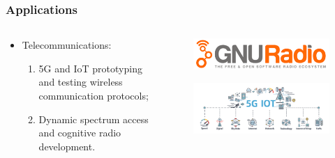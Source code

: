 \begin{frame}
	\frametitle{Applications}
    
\begin{columns}
        \begin{column}{0.5\textwidth}
     \begin{itemize}
    \item Telecommunications:
    \begin{enumerate}
     \item 5G and IoT prototyping and testing wireless communication protocols;
     \item Dynamic spectrum access and cognitive radio development.
    \end{enumerate}

     \end{itemize}
     
        \end{column}
        
        \begin{column}{0.5\textwidth}
            \begin{figure}[]
                \centering
                \includegraphics[width=\linewidth]{img/GNU_radio_logo.png}
                \label{fig:gnu_radio_logo}
            \end{figure}
            \begin{figure}
                \centering
                \includegraphics[width=\linewidth]{img/iot_5g.png}
                \label{fig:enter-label}
            \end{figure}
        \end{column}
    \end{columns}
\end{frame}

